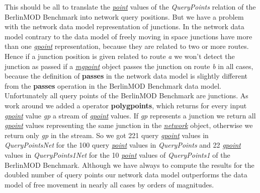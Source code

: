 \documentclass[a4paper]{article}
\newcommand{\bmodb} {BerlinMOD Benchmark}
\newcommand{\op}[1]{\textbf{#1}}
\newcommand{\var}[1]{\textsl{#1}}
\newcommand{\dt}[1]{\textsl{\underline{#1}}}
\begin{document}
{This should be all to translate the \dt{point} values of the \var{QueryPoints} relation of the \bmodb{} into network query positions. But we have a problem with the network data model representation of junctions. In the network data model contrary to the data model of freely moving in space junctions have more than one \dt{gpoint} representation, because they are related to two or more routes. Hence if a junction position is given related to route \var{a} we won't detect the junction as passed if a \dt{mgpoint} object passes the junction on route \var{b} in all cases, because the definition of \op{passes} in the network data model is slightly different from the \op{passes} operation in the \bmodb{} data model. Unfortunately all query points of the \bmodb{} are junctions. As work around we added a operator \op{polygpoints}, which returns for every input \dt{gpoint} value \var{gp} a stream of \dt{gpoint} values. If \var{gp} represents a junction we return all \dt{gpoint} values representing the same junction in the \dt{network} object, otherwise we return only \var{gp} in the stream. So we got 221 query \dt{gpoint} values in \var{QueryPointsNet} for the 100 query \dt{point} values in \var{QueryPoints} and 22 \dt{gpoint} values in \var{QueryPoints1Net} for the 10 \dt{point} values of \var{QueryPoints1} of the \bmodb{}. Although we have always to compute the results for the doubled number of query points our network data model outperforms the data model of free movement in nearly all cases by orders of magnitudes.

}
\end{document}

